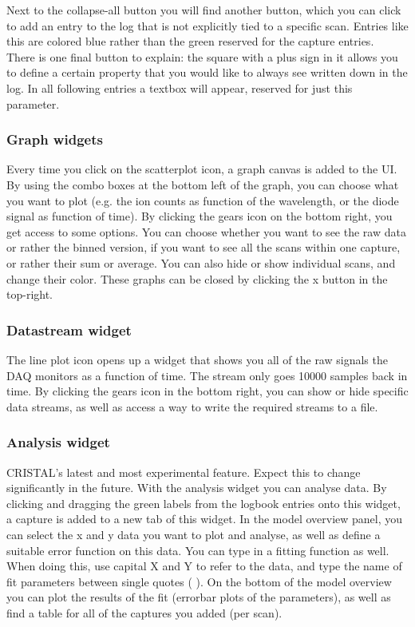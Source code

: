 \documentclass[10pt,a4paper]{article}
\begin{document}
Next to the collapse-all button you will find another button, which you can click to add an entry to the log that is not explicitly tied to a specific scan. Entries like this are colored blue rather than the green reserved for the capture entries.\\

There is one final button to explain: the square with a plus sign in it allows you to define a certain property that you would like to always see written down in the log. In all following entries a textbox will appear, reserved for just this parameter.\\



\subsubsection{Graph widgets}

Every time you click on the scatterplot icon, a graph canvas is added to the UI. By using the combo boxes at the bottom left of the graph, you can choose what you want to plot (e.g. the ion counts as function of the wavelength, or the diode signal as function of time). By clicking the gears icon on the bottom right, you get access to some options. You can choose whether you want to see the raw data or rather the binned version, if you want to see all the scans within one capture, or rather their sum or average. You can also hide or show individual scans, and change their color. These graphs can be closed by clicking the x button in the top-right.

\subsubsection{Datastream widget}

The line plot icon opens up a widget that shows you all of the raw signals the DAQ monitors as a function of time. The stream only goes 10000 samples back in time. By clicking the gears icon in the bottom right, you can show or hide specific data streams, as well as access a way to write the required streams to a file. 

\subsubsection{Analysis widget}

CRISTAL’s latest and most experimental feature. Expect this to change significantly in the future.
With the analysis widget you can analyse data. By clicking and dragging the green labels from the logbook entries onto this widget, a capture is added to a new tab of this widget. In the model overview panel, you can select the x and y data you want to plot and analyse, as well as define a suitable error function on this data. You can type in a fitting function as well. When doing this, use capital X and Y to refer to the data, and type the name of fit parameters between single quotes ( \‘ ). On the bottom of the model overview you can plot the results of the fit (errorbar plots of the parameters), as well as find a table for all of the captures you added (per scan).\\
\end{document}
